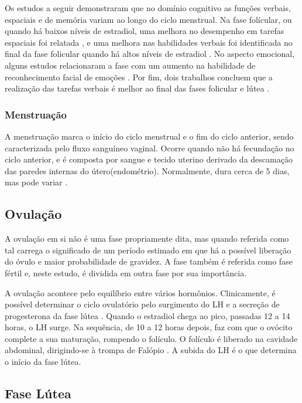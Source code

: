 Os estudos a seguir demonstraram que no domínio cognitivo 
as funções verbais, espaciais e de memória variam ao longo do ciclo 
menstrual. Na fase folícular, ou quando há baixos níveis de estradiol, 
uma melhora no desempenho em tarefas espaciais foi relatada 
\cite{hausmann2000,maki2002, courvoisier2013, becker1982, phillips1992}, 
e uma melhora nas habilidades verbais foi identificada 
no final da fase folicular quando há altos níveis de estradiol 
\cite{Rosenberg2002}. No aspecto emocional, alguns estudos relacionaram a 
fase com um aumento na habilidade de reconhecimento facial de emoções 
\cite{derntl2013}. Por fim, dois trabalhos concluem que a realização das tarefas verbais é melhor 
ao final das fases folicular e lútea \cite{Rosenberg2002, solis2004}.


\subsubsection{Menstruação}

A menstruação marca o início do ciclo menstrual e o fim do ciclo anterior, sendo 
caracterizada pelo fluxo sanguíneo vaginal. Ocorre quando não há 
fecundação no ciclo anterior, e é composta por sangue e tecido uterino 
derivado da descamação das paredes internas do útero(endométrio). 
Normalmente, dura cerca de 5 dias, mas pode variar \cite{guyton2012}.

\subsection{Ovulação}

A ovulação em si não é uma fase propriamente dita, mas quando referida 
como tal carrega o significado de um período estimado em que há a 
possível liberação do óvulo e maior probabilidade de gravidez. 
A fase também é referida como fase fértil e, neste estudo, é dividida em 
outra fase por sua importância.

A ovulação acontece pelo equilíbrio entre vários hormônios. 
Clinicamente, é possível determinar o ciclo ovulatório pelo surgimento do 
LH e a secreção de progesterona da fase lútea \cite{fritz2010}. 
Quando o estradiol chega ao pico, passadas 12 a 14 horas, o LH surge. 
Na sequência, de 10 a 12 horas depois, faz com que o ovócito complete a 
sua maturação, rompendo o folículo. O folículo é liberado na cavidade 
abdominal, dirigindo-se à trompa de Falópio \cite{fritz2010}. 
A subida do LH é o que determina o início da fase lútea.

\subsection{Fase Lútea}

